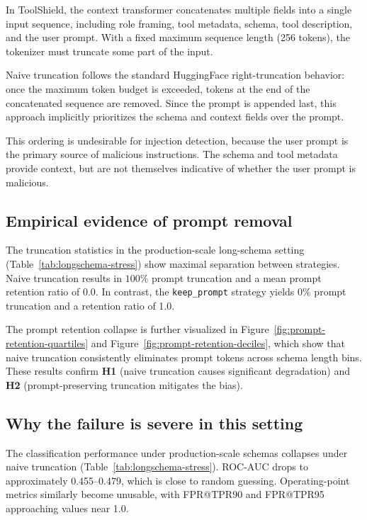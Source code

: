 In ToolShield, the context transformer concatenates multiple fields into a single input sequence, including role framing, tool metadata, schema, tool description, and the user prompt. With a fixed maximum sequence length (256 tokens), the tokenizer must truncate some part of the input.

Naive truncation follows the standard HuggingFace right-truncation behavior: once the maximum token budget is exceeded, tokens at the end of the concatenated sequence are removed. Since the prompt is appended last, this approach implicitly prioritizes the schema and context fields over the prompt.

This ordering is undesirable for injection detection, because the user prompt is the primary source of malicious instructions. The schema and tool metadata provide context, but are not themselves indicative of whether the user prompt is malicious.

\subsection{Empirical evidence of prompt removal}

The truncation statistics in the production-scale long-schema setting (Table~\ref{tab:longschema-stress}) show maximal separation between strategies. Naive truncation results in $100\%$ prompt truncation and a mean prompt retention ratio of 0.0. In contrast, the \texttt{keep\_prompt} strategy yields $0\%$ prompt truncation and a retention ratio of 1.0.

The prompt retention collapse is further visualized in Figure~\ref{fig:prompt-retention-quartiles} and Figure~\ref{fig:prompt-retention-deciles}, which show that naive truncation consistently eliminates prompt tokens across schema length bins. These results confirm \textbf{H1} (naive truncation causes significant degradation) and \textbf{H2} (prompt-preserving truncation mitigates the bias).

\subsection{Why the failure is severe in this setting}

The classification performance under production-scale schemas collapses under naive truncation (Table~\ref{tab:longschema-stress}). ROC-AUC drops to approximately 0.455--0.479, which is close to random guessing. Operating-point metrics similarly become unusable, with FPR@TPR90 and FPR@TPR95 approaching values near 1.0.

